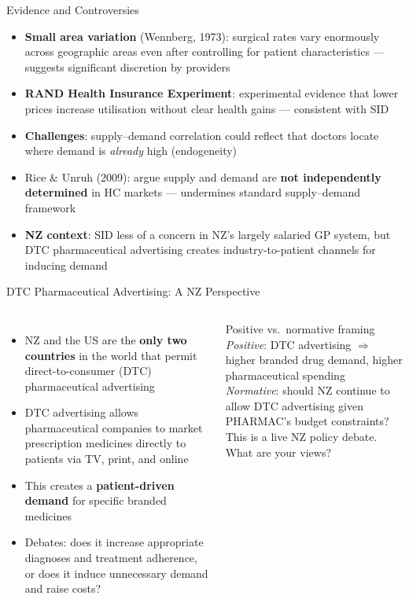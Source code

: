 \documentclass[aspectratio=169, 12pt]{beamer}
\begin{document}
\begin{frame}{Evidence and Controversies}
  \begin{itemize}
    \item \textbf{Small area variation} (Wennberg, 1973): surgical rates vary enormously across
          geographic areas even after controlling for patient characteristics --- suggests
          significant discretion by providers
    \item \textbf{RAND Health Insurance Experiment}: experimental evidence that lower prices
          increase utilisation without clear health gains --- consistent with SID
    \item \textbf{Challenges}: supply--demand correlation could reflect that doctors locate
          where demand is \emph{already} high (endogeneity)
    \item Rice \& Unruh (2009): argue supply and demand are \textbf{not independently
          determined} in HC markets --- undermines standard supply--demand framework
    \item \textbf{NZ context}: SID less of a concern in NZ's largely salaried GP system,
          but DTC pharmaceutical advertising creates industry-to-patient channels for
          inducing demand
  \end{itemize}
\end{frame}

\begin{frame}{DTC Pharmaceutical Advertising: A NZ Perspective}
  \begin{columns}
      \begin{itemize}
        \item NZ and the US are the \textbf{only two countries} in the world that permit
              direct-to-consumer (DTC) pharmaceutical advertising
        \item DTC advertising allows pharmaceutical companies to market prescription medicines
              directly to patients via TV, print, and online
        \item This creates a \textbf{patient-driven demand} for specific branded medicines
        \item Debates: does it increase appropriate diagnoses and treatment adherence, or does
              it induce unnecessary demand and raise costs?
      \end{itemize}
      \begin{alertblock}{Positive vs.\ normative framing}
        \textit{Positive}: DTC advertising $\Rightarrow$ higher branded drug demand,
        higher pharmaceutical spending\\[0.3em]
        \textit{Normative}: should NZ continue to allow DTC advertising given PHARMAC's
        budget constraints?\\[0.3em]
        This is a live NZ policy debate. What are your views?
      \end{alertblock}
  \end{columns}
\end{frame}
\end{document}
